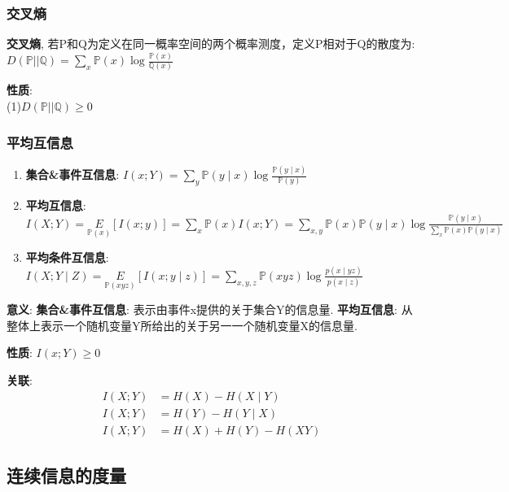 \documentclass{article}
\begin{document}
        \subsubsection{交叉熵}
            \textbf{交叉熵}, 若P和Q为定义在同一概率空间的两个概率测度，定义P相对于Q的散度为: $D(\mathbb P || \mathbb Q)=\sum\limits_x \mathbb P(x) \log \frac{\mathbb P(x)}{\mathbb Q(x)}$
            
            \textbf{性质}:\\
                (1)$D(\mathbb P || \mathbb Q) \ge 0$

        \subsubsection{平均互信息}
            \begin{enumerate}
                \item \textbf{集合&事件互信息}: $I(x ; Y)=\sum\limits_{y} \mathbb P(y \mid x) \log \frac{\mathbb P(y \mid x)}{\mathbb P(y)}$
                \item \textbf{平均互信息}: $I(X ; Y) = \underset{\mathbb P(x)}{E}[I(x ; y)] = \sum\limits_{x} \mathbb P(x) I(x ; Y)=\sum\limits_{x, y} \mathbb P(x) \mathbb P(y \mid x) \log \frac{\mathbb P(y \mid x)}{\sum\limits_{x} \mathbb P(x) \mathbb P(y \mid x)}$
                \item \textbf{平均条件互信息}: $I(X ; Y \mid Z)=\underset{\mathbb P(x y z)}{E}[I(x ; y \mid z)]=\sum\limits_{x, y, z} \mathbb P(x y z) \log \frac{p(x \mid y z)}{p(x \mid z)}$
            \end{enumerate}
            
            \textbf{意义}: \textbf{集合&事件互信息}: 表示由事件x提供的关于集合Y的信息量. \textbf{平均互信息}: 从整体上表示一个随机变量Y所给出的关于另一一个随机变量X的信息量.
            
            \textbf{性质}: $I(x ; Y) \ge 0$
            
            \textbf{关联}: 
                \begin{align*}
                    I(X ; Y) &= H(X)-H(X \mid Y) \\
                    I(X ; Y) &= H(Y)-H(Y \mid X) \\
                    I(X ; Y) &= H(X)+H(Y)-H(X Y)
                \end{align*}
             
    \subsection{连续信息的度量}
\end{document}
